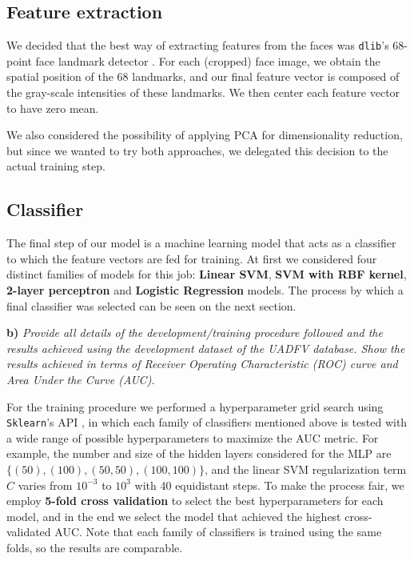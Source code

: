\documentclass[11pt]{article}
\begin{document}
\subsection*{Feature extraction}

We decided that the best way of extracting features from the faces was \texttt{dlib}'s 68-point face landmark detector \citep{dlib09}. For each (cropped) face image, we obtain the spatial position of the 68 landmarks, and our final feature vector is composed of the gray-scale intensities of these landmarks. We then center each feature vector to have zero mean.

We also considered the possibility of applying PCA for dimensionality reduction, but since we wanted to try both approaches, we delegated this decision to the actual training step.

\subsection*{Classifier}

The final step of our model is a machine learning model that acts as a classifier to which the feature vectors are fed for training. At first we considered four distinct families of models for this job: \textbf{Linear SVM}, \textbf{SVM with RBF kernel}, \textbf{2-layer perceptron} and \textbf{Logistic Regression} models. The process by which a final classifier was selected can be seen on the next section.

\textbf{b)} \textit{Provide all details of the development/training procedure followed and the results achieved using the development dataset of the UADFV database. Show the results achieved in terms of Receiver Operating Characteristic (ROC) curve and Area Under the Curve (AUC).}

For the training procedure we performed a hyperparameter grid search using \texttt{Sklearn}'s API \citep{sklearn_api}, in which each family of classifiers mentioned above is tested with a wide range of possible hyperparameters to maximize the AUC metric. For example, the number and size of the hidden layers considered for the MLP are \( \{(50), (100), (50, 50), (100, 100)\} \), and the linear SVM regularization term \( C \) varies from \( 10^{-3} \) to \( 10^{3} \) with 40 equidistant steps. To make the process fair, we employ \textbf{5-fold cross validation} to select the best hyperparameters for each model, and in the end we select the model that achieved the highest cross-validated AUC. Note that each family of classifiers is trained using the same folds, so the results are comparable.
\end{document}
